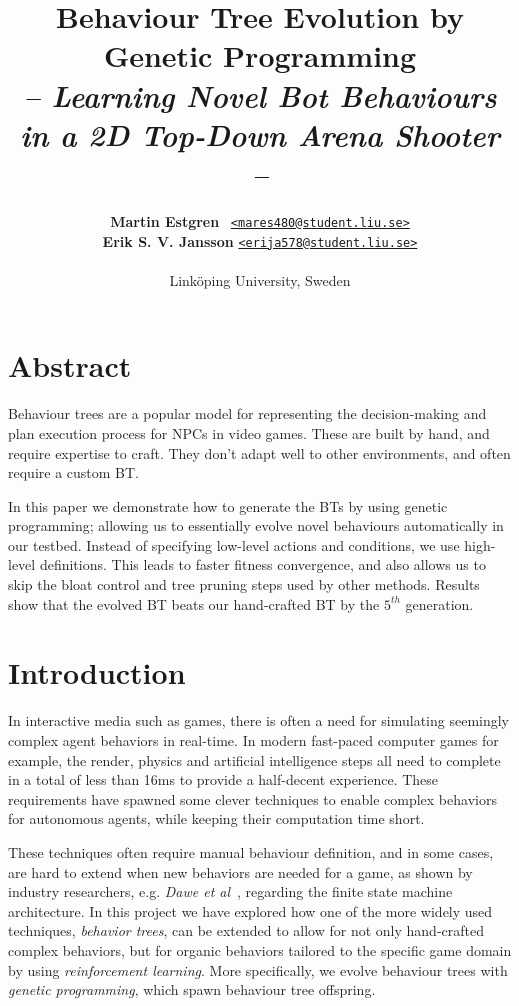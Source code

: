 \documentclass[a4paper, twocolumn]{article}
\title{\textbf{Behaviour Tree Evolution by Genetic Programming}\\
       \Large{\emph{-- Learning Novel Bot Behaviours in a 2D Top-Down Arena Shooter --}}}
\author{{\textbf{Martin Estgren}} \;\;\;\;\;\;\;\;\;\, {\href{mailto:mares480@student.liu.se}
                                                       {\texttt{<mares480@student.liu.se>}}} \\
        {\textbf{Erik S. V. Jansson}} \;\;\;\;         {\href{mailto:erija578@student.liu.se}
                                                       {\texttt{<erija578@student.liu.se>}}} \\~\\
        {Linköping University, Sweden}\vspace{-2.0ex}}
\begin{document}
    \maketitle
    \section*{Abstract}

    Behaviour trees are a popular model for representing the decision-making and plan execution process for NPCs in video games. These are built by hand, and require expertise to craft. They don't adapt well to other environments, and often require a custom BT.

    In this paper we demonstrate how to generate the BTs by using genetic programming; allowing us to essentially evolve novel behaviours automatically in our testbed. Instead of specifying low-level actions and conditions, we use high-level definitions. This leads to faster fitness convergence, and also allows us to skip the bloat control and tree pruning steps used by other methods. Results show that the evolved BT beats our hand-crafted BT by the \(5^{th}\) generation. \footnotemark[1]

    \vspace{1.0em}

    \begingroup
    \def\addvspace#1{}
    \tableofcontents
    \endgroup
    \newpage

    \newpage %
    \nocite{*} %
    
    
    \clearpage

    \section{Introduction} \label{sec:introduction}

    In interactive media such as games, there is often a need for simulating seemingly complex agent behaviors in real-time. In modern fast-paced computer games for example, the render, physics and artificial intelligence steps all need to complete in a total of less than 16ms to provide a half-decent experience. These requirements have spawned some clever techniques to enable complex behaviors for autonomous agents, while keeping their computation time short.

    These techniques often require manual behaviour definition, and in some cases, are hard to extend when new behaviors are needed for a game, as shown by industry researchers, e.g. \emph{Dawe et al}~\cite{dawe2014overview}, regarding the finite state machine architecture. In this project we have explored how one of the more widely used techniques, \emph{behavior trees}, can be extended to allow for not only hand-crafted complex behaviors, but for organic behaviors tailored to the specific game domain by using \emph{reinforcement learning}. More specifically, we evolve behaviour trees with \emph{genetic programming}, which spawn behaviour tree offspring.
\end{document}
